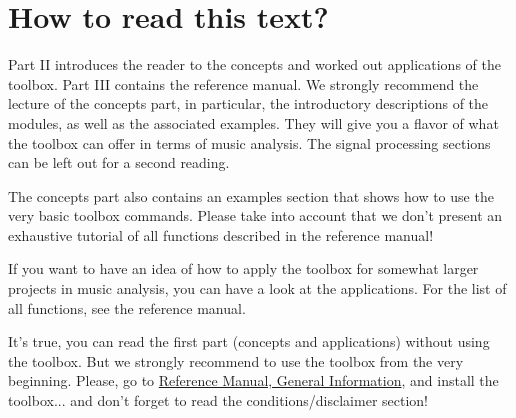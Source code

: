 
\chapter*{How to read this text?}
\hypertarget{Chapter:HowToRead}{}

Part II introduces the reader to the concepts and worked out
applications of the toolbox. Part III contains the reference
manual. We strongly recommend the lecture of the concepts part, in
particular, the introductory descriptions of the modules, as well
as the associated examples. They will give you a flavor of what
the toolbox can offer in terms of music analysis. The signal
processing sections can be left out for a second reading.

The concepts part also contains an examples section that shows how
to use the very basic toolbox commands. Please take into account
that we don't present an exhaustive tutorial of all functions
described in the reference manual!

If you want to have an idea of how to apply the toolbox for
somewhat larger projects in music analysis, you can have a look at
the applications. For the list of all functions, see the reference
manual.

It's true, you can read the first part (concepts and applications)
without using the toolbox. But we strongly recommend to use the
toolbox from the very beginning. Please, go to
\hyperlink{ReferenceManual:GeneralInformation}{Reference Manual,
General Information}, and install the toolbox... and don't forget
to read the conditions/disclaimer section!
